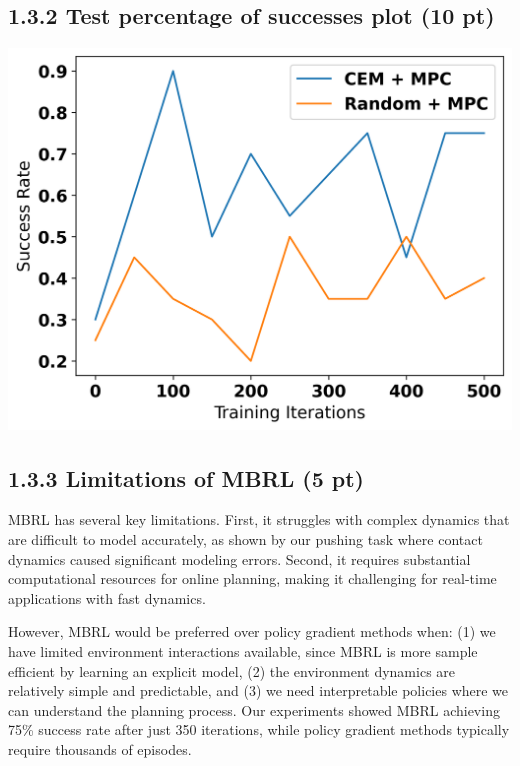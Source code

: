 \documentclass[12pt]{article}
\begin{document}
\subsection*{1.3.2 Test percentage of successes plot (10 pt)}

\begin{tcolorbox}[fit,height=30em, width=40em, blank, borderline={1pt}{1pt},nobeforeafter]
\begin{center}
    \includegraphics[width=40em]{2-cem-vs-random-Success Rate}
\end{center}
\end{tcolorbox}

\subsection*{1.3.3 Limitations of MBRL (5 pt)}

\begin{tcolorbox}[fit,height=20em, width=40em, blank, borderline={1pt}{1pt},nobeforeafter]
MBRL has several key limitations. First, it struggles with complex dynamics that are difficult to model accurately, as shown by our pushing task where contact dynamics caused significant modeling errors. Second, it requires substantial computational resources for online planning, making it challenging for real-time applications with fast dynamics.

However, MBRL would be preferred over policy gradient methods when: (1) we have limited environment interactions available, since MBRL is more sample efficient by learning an explicit model, (2) the environment dynamics are relatively simple and predictable, and (3) we need interpretable policies where we can understand the planning process. Our experiments showed MBRL achieving 75\% success rate after just 350 iterations, while policy gradient methods typically require thousands of episodes.
\end{tcolorbox}
\end{document}
